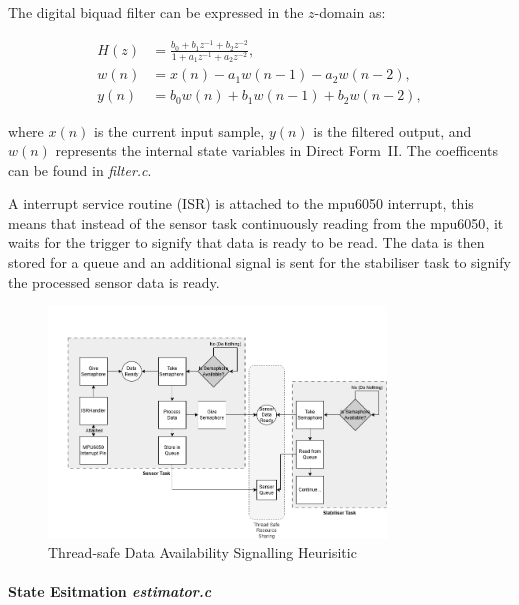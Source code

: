 The digital biquad filter can be expressed in the $z$-domain as:

\begin{align}
H(z) &= \frac{b_0 + b_1 z^{-1} + b_2 z^{-2}}{1 + a_1 z^{-1} + a_2 z^{-2}}, \\[6pt]
w(n) &= x(n) - a_1 w(n-1) - a_2 w(n-2), \\[6pt]
y(n) &= b_0 w(n) + b_1 w(n-1) + b_2 w(n-2),
\end{align}

where \( x(n) \) is the current input sample, \( y(n) \) is the filtered output, and \( w(n) \) represents the internal state variables in Direct Form~II. The coefficents can be found in \textit{filter.c}.

A interrupt service routine (ISR) is attached to the \gls{mpu6050} interrupt, this means that instead of the sensor task continuously reading from the \gls{mpu6050}, it waits for the trigger to signify that data is ready to be read. The data is then stored for a queue and an additional signal is sent for the stabiliser task to signify the processed sensor data is ready.

\begin{figure}[H]
    \centering
    \captionsetup{justification=centering, margin=1cm}
    \includegraphics[width=0.8\textwidth]{img/sensor-semaphore.PNG}
    \caption{Thread-safe Data Availability Signalling Heurisitic}
    \label{fig:arch-process}
\end{figure}


\paragraph{\textbf{State Esitmation} \textit{estimator.c}} \leavevmode 

